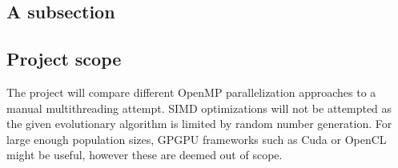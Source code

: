 \documentclass[journal,transmag]{IEEEtran}
\begin{document}
	
	\subsection{A subsection}
		

\subsection{Project scope}
        The project will compare different OpenMP parallelization approaches to a manual multithreading
        attempt. SIMD optimizations will not be attempted as the given evolutionary algorithm 
        is limited by random number generation. For large enough population sizes, GPGPU frameworks
        such as Cuda or OpenCL might be useful, however these are deemed out of scope.
	
\end{document}
